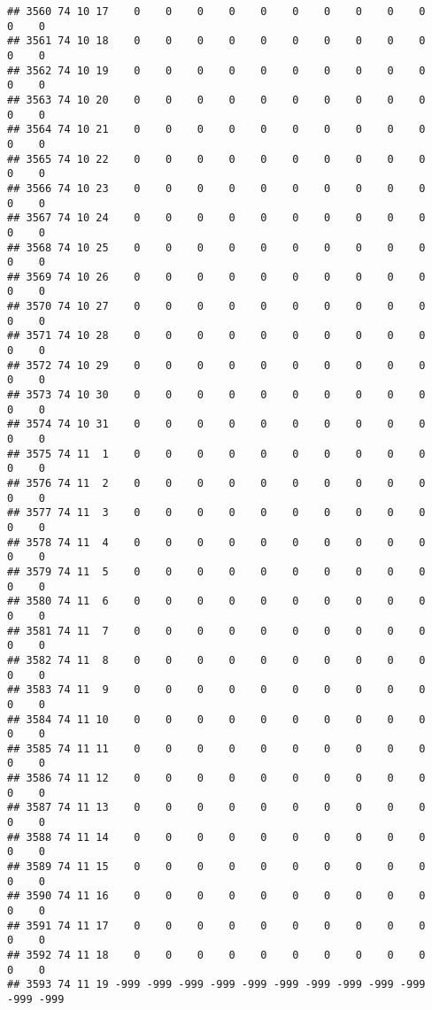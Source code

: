 \documentclass[]{article}
\begin{document}
\begin{verbatim}
## 3560 74 10 17    0    0    0    0    0    0    0    0    0    0    0    0
## 3561 74 10 18    0    0    0    0    0    0    0    0    0    0    0    0
## 3562 74 10 19    0    0    0    0    0    0    0    0    0    0    0    0
## 3563 74 10 20    0    0    0    0    0    0    0    0    0    0    0    0
## 3564 74 10 21    0    0    0    0    0    0    0    0    0    0    0    0
## 3565 74 10 22    0    0    0    0    0    0    0    0    0    0    0    0
## 3566 74 10 23    0    0    0    0    0    0    0    0    0    0    0    0
## 3567 74 10 24    0    0    0    0    0    0    0    0    0    0    0    0
## 3568 74 10 25    0    0    0    0    0    0    0    0    0    0    0    0
## 3569 74 10 26    0    0    0    0    0    0    0    0    0    0    0    0
## 3570 74 10 27    0    0    0    0    0    0    0    0    0    0    0    0
## 3571 74 10 28    0    0    0    0    0    0    0    0    0    0    0    0
## 3572 74 10 29    0    0    0    0    0    0    0    0    0    0    0    0
## 3573 74 10 30    0    0    0    0    0    0    0    0    0    0    0    0
## 3574 74 10 31    0    0    0    0    0    0    0    0    0    0    0    0
## 3575 74 11  1    0    0    0    0    0    0    0    0    0    0    0    0
## 3576 74 11  2    0    0    0    0    0    0    0    0    0    0    0    0
## 3577 74 11  3    0    0    0    0    0    0    0    0    0    0    0    0
## 3578 74 11  4    0    0    0    0    0    0    0    0    0    0    0    0
## 3579 74 11  5    0    0    0    0    0    0    0    0    0    0    0    0
## 3580 74 11  6    0    0    0    0    0    0    0    0    0    0    0    0
## 3581 74 11  7    0    0    0    0    0    0    0    0    0    0    0    0
## 3582 74 11  8    0    0    0    0    0    0    0    0    0    0    0    0
## 3583 74 11  9    0    0    0    0    0    0    0    0    0    0    0    0
## 3584 74 11 10    0    0    0    0    0    0    0    0    0    0    0    0
## 3585 74 11 11    0    0    0    0    0    0    0    0    0    0    0    0
## 3586 74 11 12    0    0    0    0    0    0    0    0    0    0    0    0
## 3587 74 11 13    0    0    0    0    0    0    0    0    0    0    0    0
## 3588 74 11 14    0    0    0    0    0    0    0    0    0    0    0    0
## 3589 74 11 15    0    0    0    0    0    0    0    0    0    0    0    0
## 3590 74 11 16    0    0    0    0    0    0    0    0    0    0    0    0
## 3591 74 11 17    0    0    0    0    0    0    0    0    0    0    0    0
## 3592 74 11 18    0    0    0    0    0    0    0    0    0    0    0    0
## 3593 74 11 19 -999 -999 -999 -999 -999 -999 -999 -999 -999 -999 -999 -999

\end{verbatim}
\end{document}

